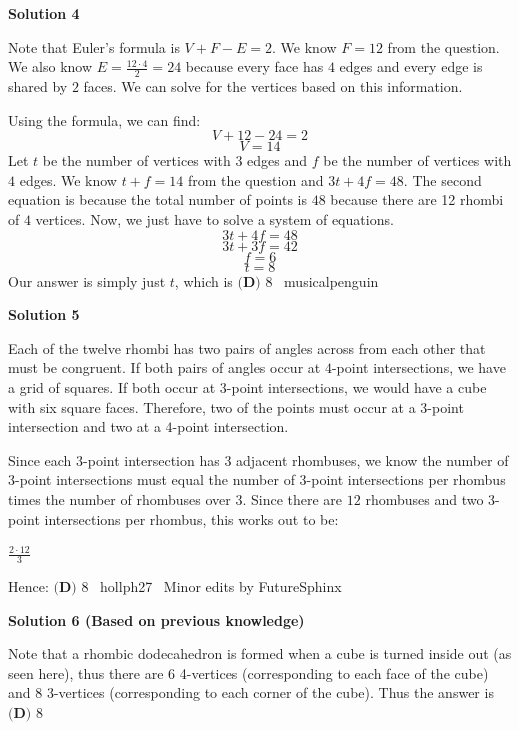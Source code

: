 \begin{enumerate}
 



\textbf{Solution 4}

Note that Euler's formula is $V+F-E=2$. We know $F=12$ from the question. We also know $E = \frac{12 \cdot 4}{2} = 24$ because every face has $4$ edges and every edge is shared by $2$ faces. We can solve for the vertices based on this information.

 Using the formula, we can find:
 \[V + 12 - 24 = 2\]
 \[V = 14\]Let $t$ be the number of vertices with $3$ edges and $f$ be the number of vertices with $4$ edges. We know $t+f = 14$ from the question and $3t + 4f = 48$. The second equation is because the total number of points is $48$ because there are 12 rhombi of $4$ vertices. Now, we just have to solve a system of equations.
 \[3t + 4f = 48\]
 \[3t + 3f = 42\]
 \[f = 6\]
 \[t = 8\]Our answer is simply just $t$, which is $\boxed{\textbf{(D) }8}$ ~musicalpenguin

 



\textbf{Solution 5}

Each of the twelve rhombi has two pairs of angles across from each other that must be congruent. If both pairs of angles occur at $4$-point intersections, we have a grid of squares. If both occur at $3$-point intersections, we would have a cube with six square faces. Therefore, two of the points must occur at a $3$-point intersection and two at a $4$-point intersection.

 Since each $3$-point intersection has $3$ adjacent rhombuses, we know the number of $3$-point intersections must equal the number of $3$-point intersections per rhombus times the number of rhombuses over $3$. Since there are $12$ rhombuses and two $3$-point intersections per rhombus, this works out to be:

 $\frac{2\cdot12}{3}$

 Hence: $\boxed{\textbf{(D) }8}$ ~hollph27 ~Minor edits by FutureSphinx

 



\textbf{Solution 6 (Based on previous knowledge)}

Note that a rhombic dodecahedron is formed when a cube is turned inside out (as seen here), thus there are 6 4-vertices (corresponding to each face of the cube) and 8 3-vertices (corresponding to each corner of the cube). Thus the answer is $\boxed{\textbf{(D) }8}$





\end{enumerate}
